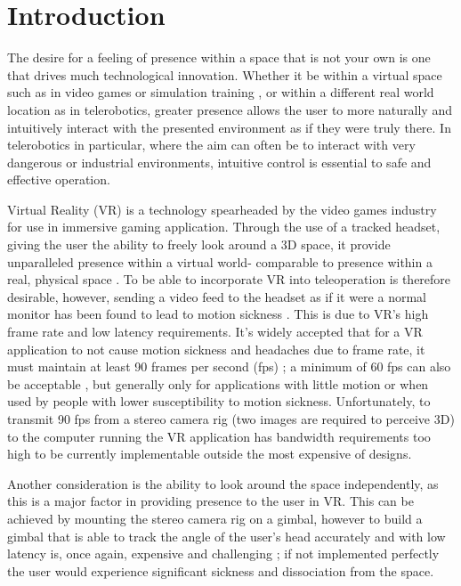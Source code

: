 \chapter{Introduction}
\label{chapter:intro}

The desire for a feeling of presence \cite{presence} within a space that is not your own is one that drives much technological innovation. Whether it be within a virtual space such as in video games or simulation training \cite{alexander2005gaming}, or within a different real world location as in telerobotics, greater presence allows the user to more naturally and intuitively interact with the presented environment as if they were truly there. In telerobotics in particular, where the aim can often be to interact with very dangerous or industrial environments, intuitive control is essential to safe and effective operation.

Virtual Reality (VR) is a technology spearheaded by the video games industry for use in immersive gaming application. Through the use of a tracked headset, giving the user the ability to freely look around a 3D space, it provide unparalleled presence within a virtual world- comparable to presence within a real, physical space \cite{loomis2016presence,McGlynn}. To be able to incorporate VR into teleoperation is therefore desirable, however, sending a video feed to the headset as if it were a normal monitor has been found to lead to motion sickness \cite{han2017design}. This is due to VR's high frame rate and low latency requirements. It's widely accepted that for a VR application to not cause motion sickness and headaches due to frame rate, it must maintain at least 90 frames per second (fps) \cite{FrameRate}; a minimum of 60 fps can also be acceptable \cite{Borg2013UsingAG}, but generally only for applications with little motion or when used by people with lower susceptibility to motion sickness. Unfortunately, to transmit 90 fps from a stereo camera rig (two images are required to perceive 3D) to the computer running the VR application has bandwidth requirements too high to be currently implementable outside the most expensive of designs.

Another consideration is the ability to look around the space independently, as this is a major factor in providing presence to the user in VR. This can be achieved by mounting the stereo camera rig on a gimbal, however to build a gimbal that is able to track the angle of the user's head accurately and with low latency is, once again, expensive and challenging \cite{DORA}; if not implemented perfectly the user would experience significant sickness and dissociation from the space.

